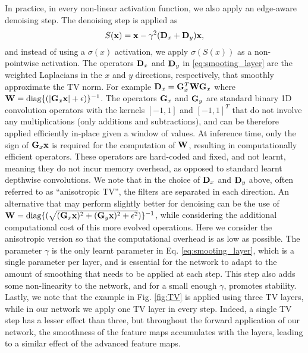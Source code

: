 \documentclass[reqno]{amsart}
\newcommand{\bfx}{ {\bf x}}
\newcommand{\bfD}{{\bf D}}
\newcommand{\bfG}{{\bf G}}
\newcommand{\bfW}{{\bf W}}
\begin{document}
In practice, in every non-linear activation function, we also apply an edge-aware denoising step. The denoising step is applied as
\begin{equation}\label{eq:smooting_layer}
S(\bfx) = \bfx - \gamma^2(\bfD_x + \bfD_y)\bfx,
\end{equation}
and instead of using a $\sigma(x)$ activation, we apply $\sigma(S(x))$ as a non-pointwise activation. The operators $\bfD_x$ and $\bfD_y$ in \eqref{eq:smooting_layer} are the weighted Laplacians in the $x$ and $y$ directions, respectively, that smoothly approximate the TV norm. For example $\bfD_x = \bfG_x^T\bfW\bfG_x$ where $\bfW = \mbox{diag}\{(|\bfG_x\bfx|+\epsilon )\}^{-1}$.
The operators $\bfG_x$ and $\bfG_y$ are standard binary 1D convolution operators with the kernels $[-1,1]$ and $[-1,1]^T$ that do not involve any multiplications (only additions and subtractions), and can be therefore applied efficiently in-place given a window of values. At inference time, only the sign of $\bfG_x\bfx$ is required for the computation of $\bfW$, resulting in computationally efficient operators. These operators are hard-coded and fixed, and not learnt, meaning they do not incur memory overhead, as opposed to standard learnt depthwise convolutions. We note that in the choice of $\bfD_x$ and $\bfD_y$ above, often referred to as ``anisotropic TV'', the filters are separated in each direction. An alternative that may perform slightly better for denoising can be the use of $\bfW = \mbox{diag}\{(\sqrt{(\bfG_x\bfx)^2 + (\bfG_y\bfx)^2 + \epsilon^2})\}^{-1}$, while considering the additional computational cost of this more evolved operations. Here we consider the anisotropic version so that the computational overhead is as low as possible. The parameter $\gamma$ is the only learnt parameter in Eq. \eqref{eq:smooting_layer}, which is a single parameter per layer, and is essential for the network to adapt to the amount of smoothing that needs to be applied at each step. This step also adds some non-linearity to the network, and for a small enough $\gamma$, promotes stability. Lastly, we note that the example in Fig. \ref{fig:TV} is applied using three TV layers, while in our network we apply one TV layer in every step. Indeed, a single TV step has a lesser effect than three, but throughout the forward application of our network, the smoothness of the feature maps accumulates with the layers, leading to a similar effect of the advanced feature maps.  
\end{document}
